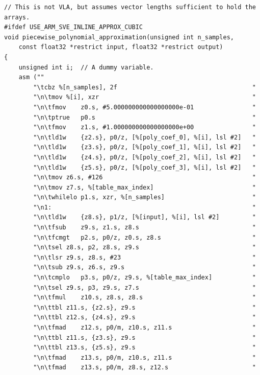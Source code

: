 \documentclass[11pt,a4paper,twoside,english]{extarticle}
\begin{document}
\begin{lstfloat}[H]
\begin{lstlisting}[style=C, captionpos=b, caption={Piecewise polynomial approximation implementations using \arm SVE inline assembly.}, label={code:c:piecewise_polynomial_approximation_use_arm_sve_inline_approx_cubic}]
// This is not VLA, but assumes vector lengths sufficient to hold the arrays.
#ifdef USE_ARM_SVE_INLINE_APPROX_CUBIC
void piecewise_polynomial_approximation(unsigned int n_samples, 
    const float32 *restrict input, float32 *restrict output)
{
    unsigned int i;  // A dummy variable.
    asm (""
        "\tcbz %[n_samples], 2f                                     "  
        "\n\tmov %[i], xzr                                          "
        "\n\tfmov    z0.s, #5.000000000000000000e-01                "
        "\n\tptrue   p0.s                                           "
        "\n\tfmov    z1.s, #1.000000000000000000e+00                "
        "\n\tld1w    {z2.s}, p0/z, [%[poly_coef_0], %[i], lsl #2]   "
        "\n\tld1w    {z3.s}, p0/z, [%[poly_coef_1], %[i], lsl #2]   "
        "\n\tld1w    {z4.s}, p0/z, [%[poly_coef_2], %[i], lsl #2]   "
        "\n\tld1w    {z5.s}, p0/z, [%[poly_coef_3], %[i], lsl #2]   "
        "\n\tmov z6.s, #126                                         "
        "\n\tmov z7.s, %[table_max_index]                           "
        "\n\twhilelo p1.s, xzr, %[n_samples]                        "
        "\n1:                                                       "
        "\n\tld1w    {z8.s}, p1/z, [%[input], %[i], lsl #2]         "
        "\n\tfsub    z9.s, z1.s, z8.s                               "
        "\n\tfcmgt   p2.s, p0/z, z0.s, z8.s                         "
        "\n\tsel z8.s, p2, z8.s, z9.s                               "
        "\n\tlsr z9.s, z8.s, #23                                    "
        "\n\tsub z9.s, z6.s, z9.s                                   "
        "\n\tcmplo   p3.s, p0/z, z9.s, %[table_max_index]           "
        "\n\tsel z9.s, p3, z9.s, z7.s                               "
        "\n\tfmul    z10.s, z8.s, z8.s                              "
        "\n\ttbl z11.s, {z2.s}, z9.s                                "
        "\n\ttbl z12.s, {z4.s}, z9.s                                "
        "\n\tfmad    z12.s, p0/m, z10.s, z11.s                      "
        "\n\ttbl z11.s, {z3.s}, z9.s                                "
        "\n\ttbl z13.s, {z5.s}, z9.s                                "
        "\n\tfmad    z13.s, p0/m, z10.s, z11.s                      "
        "\n\tfmad    z13.s, p0/m, z8.s, z12.s                       "

\end{lstlisting}
\end{lstfloat}
\end{document}
